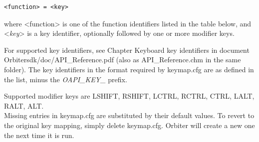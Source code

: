 \documentclass[Orbiter User Manual.tex]{subfiles}
\begin{document}
\begin{lstlisting}[language=OSFS]
<function> = <key>
\end{lstlisting}

\noindent
where <function> is one of the function identifiers listed in the table below, and <\textit{key}> is a key identifier, optionally followed by one or more modifier keys.
\begin{sloppypar}%
\noindent
For supported key identifiers, see Chapter Keyboard key identifiers in document Orbitersdk/doc/API\_Reference.pdf (also as API\_Reference.chm in the same folder). The key identifiers in the format required by keymap.cfg are as defined in the list, minus the \textit{OAPI\_KEY\_} prefix.
\end{sloppypar}
\noindent
Supported modifier keys are LSHIFT, RSHIFT, LCTRL, RCTRL, CTRL, LALT, RALT, ALT.\\
Missing entries in keymap.cfg are substituted by their default values. To revert to the original key mapping, simply delete keymap.cfg. Orbiter will create a new one the next time it is run.
\end{document}
